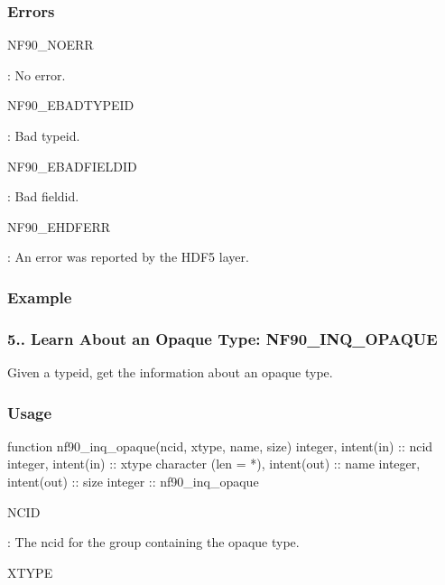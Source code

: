 \subsubsection*{Errors}

{\ttfamily N\+F90\+\_\+\+N\+O\+E\+RR}

\+: No error.

{\ttfamily N\+F90\+\_\+\+E\+B\+A\+D\+T\+Y\+P\+E\+ID}

\+: Bad typeid.

{\ttfamily N\+F90\+\_\+\+E\+B\+A\+D\+F\+I\+E\+L\+D\+ID}

\+: Bad fieldid.

{\ttfamily N\+F90\+\_\+\+E\+H\+D\+F\+E\+RR}

\+: An error was reported by the H\+D\+F5 layer.

\subsubsection*{Example}\hypertarget{f90-user-defined-data-types_f90-learn-about-an-opaque-type-nf90_inq_opaque}{}\subsubsection{5.. Learn About an Opaque Type\+: N\+F90\+\_\+\+I\+N\+Q\+\_\+\+O\+P\+A\+Q\+UE}\label{f90-user-defined-data-types_f90-learn-about-an-opaque-type-nf90_inq_opaque}
Given a typeid, get the information about an opaque type.

\subsubsection*{Usage}


\begin{DoxyCode}
\textcolor{keyword}{function }nf90\_inq\_opaque(ncid, xtype, name, size)
  \textcolor{keywordtype}{integer}, \textcolor{keywordtype}{intent(in)} :: ncid
  \textcolor{keywordtype}{integer}, \textcolor{keywordtype}{intent(in)} :: xtype
  \textcolor{keywordtype}{character (len = *)}, \textcolor{keywordtype}{intent(out)} :: name
  \textcolor{keywordtype}{integer}, \textcolor{keywordtype}{intent(out)} :: size
  \textcolor{keywordtype}{integer} :: nf90\_inq\_opaque
\end{DoxyCode}


{\ttfamily N\+C\+ID}

\+: The ncid for the group containing the opaque type.

{\ttfamily X\+T\+Y\+PE}

